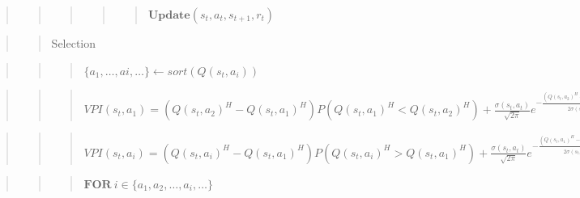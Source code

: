 \documentclass[10pt,a4paper,onecolumn]{article}
\begin{document}
\begin{quote}
\begin{quote}
\begin{quote}
\begin{quote}
\begin{quote}
\(\textbf{Update}(s_t,a_t, s_{t+1}, r_t)\)
\end{quote}
\end{quote}
\end{quote}
\end{quote}
\end{quote}

\begin{quote}
\begin{quote}
Selection
\end{quote}
\end{quote}

\begin{quote}
\begin{quote}
\begin{quote}
\(\{a_1,\ldots,ai,\ldots\} \leftarrow sort(Q(s_t,a_i))\)
\end{quote}
\end{quote}
\end{quote}

\begin{quote}
\begin{quote}
\begin{quote}
\(VPI(s_t, a_1) = (Q(s_t,a_2)^{H}-Q(s_t,a_1)^{H})P(Q(s_t,a_1)^{H}<Q(s_t,a_2)^{H}) + \frac{\sigma(s_t,a_t)}{\sqrt{2\pi}} e^{-\frac{(Q(s_t,a_2)^H - Q(s_t,a_1)^H)^2}{2\sigma(s_t,a_t)^2}}\)
\end{quote}
\end{quote}
\end{quote}

\begin{quote}
\begin{quote}
\begin{quote}
\(VPI(s_t, a_i) = (Q(s_t,a_i)^{H}-Q(s_t,a_1)^{H})P(Q(s_t,a_i)^{H}>Q(s_t,a_1)^{H}) + \frac{\sigma(s_t,a_t)}{\sqrt{2\pi}} e^{-\frac{(Q(s_t,a_1)^H - Q(s_t,a_i)^H)^2}{2\sigma(s_t,a_t)^2}}\)
\end{quote}
\end{quote}
\end{quote}

\begin{quote}
\begin{quote}
\begin{quote}
\(\textbf{FOR}\ i \in \{a_1, a_2,\ldots, a_i, \ldots\}\)
\end{quote}
\end{quote}
\end{quote}
\end{document}
